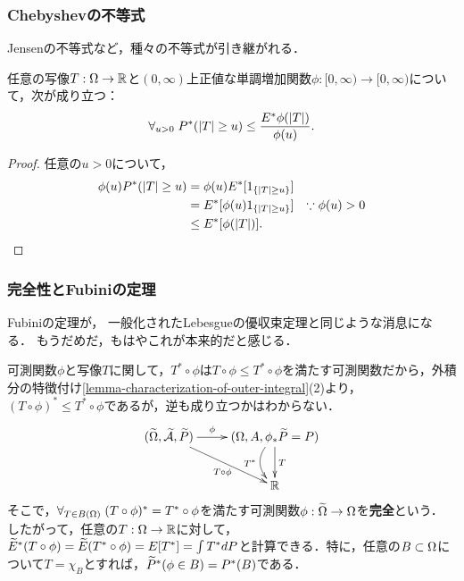 \documentclass[uplatex,dvipdfmx]{jsreport}
\begin{document}
\subsubsection{Chebyshevの不等式}

\begin{tcolorbox}[colframe=ForestGreen, colback=ForestGreen!10!white,breakable,colbacktitle=ForestGreen!40!white,coltitle=black,fonttitle=\bfseries\sffamily,
title=]
    Jensenの不等式など，種々の不等式が引き継がれる．
\end{tcolorbox}

\begin{lemma}[外積分におけるChebyshevの不等式]
    任意の写像$T:\Omega\to\mathbb{R}$と$(0,\infty)$上正値な単調増加関数$\phi:[0,\infty)\to[0,\infty)$について，次が成り立つ：
    \[\forall_{u>0}\;P^*(\lvert T\rvert\ge u)\le\frac{E^*\phi(\lvert T\rvert)}{\phi(u)}.\]
\end{lemma}
\begin{proof}
    任意の$u>0$について，
    \begin{align*}
        \phi(u)P^*(\lvert T\rvert\ge u)&=\phi(u)E^*[1_{\left\{\lvert T\rvert\ge u\right\}}]\\
        &=E^*[\phi(u)1_{\left\{\lvert T\rvert\ge u\right\}}]&\because\phi(u)>0\\
        &\le E^*[\phi(\lvert T\rvert)].
    \end{align*}
\end{proof}

\subsubsection{完全性とFubiniの定理}

\begin{tcolorbox}[colframe=ForestGreen, colback=ForestGreen!10!white,breakable,colbacktitle=ForestGreen!40!white,coltitle=black,fonttitle=\bfseries\sffamily,
title=]
    Fubiniの定理が，
    一般化されたLebesgueの優収束定理と同じような消息になる．
    もうだめだ，もはやこれが本来的だと感じる．
\end{tcolorbox}

\begin{definition}[perfect]
    可測関数$\phi$と写像$T$に関して，$T^*\circ\phi$は$T\circ\phi\le T^*\circ\phi$を満たす可測関数だから，外積分の特徴付け\ref{lemma-characterization-of-outer-integral}(2)より，
    $(T\circ\phi)^*\le T^*\circ\phi$であるが，逆も成り立つかはわからない．
    \[\xymatrix{
        (\wt{\Om},\wt{\A},\wt{P})\ar[r]^-\phi\ar[dr]_-{T\circ\phi}&(\Om,A,\phi_*\wt{P}=P)\ar[d]^-T\ar@/_1pc/[d]_-{T^*}\\
        &\R
    }\]
    そこで，$\forall_{T\in B(\Omega)}\;(T\circ\phi)^*=T^*\circ\phi$を満たす可測関数$\phi:\widetilde{\Omega}\to\Omega$を\textbf{完全}という．
    したがって，任意の$T:\Omega\to\mathbb{R}$に対して，
    $\widetilde{E}^*(T\circ\phi)=\widetilde{E}(T^*\circ\phi)=E[T^*]=\int T^*dP$と計算できる．特に，任意の$B\subset\Omega$について$T=\chi_B$とすれば，$\widetilde{P}^*(\phi\in B)=P^*(B)$である．
\end{definition}
\end{document}
